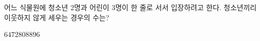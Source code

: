 어느 식물원에 청소년 2명과 어린이 3명이 한 줄로 서서 입장하려고 한다. 청소년끼리 이웃하지 않게 세우는 경우의 수는?
\begin{choices32}{$64$}{$72$}{$80$}{$88$}{$96$}\end{choices32}
